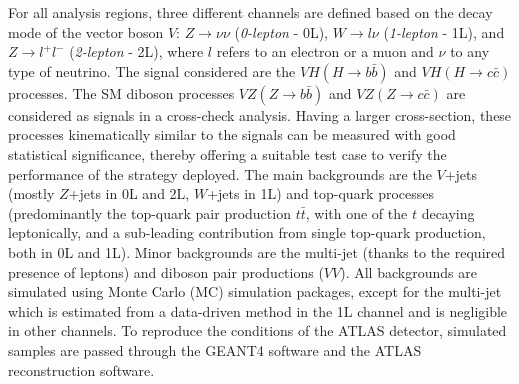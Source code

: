 For all analysis regions, three different channels are defined based on the decay mode of the vector boson $V$: $Z \rightarrow \nu \nu$ (\textit{0-lepton} - 0L), $W \rightarrow l \nu $ (\textit{1-lepton} - 1L), and $Z \rightarrow l^+ l^-$ (\textit{2-lepton} - 2L), where $l$ refers to an electron or a muon and $\nu$ to any type of neutrino. The signal considered are the  $VH (H\rightarrow b\bar{b})$ and $VH (H\rightarrow c\bar{c})$ processes. The SM diboson processes $VZ (Z\rightarrow b\bar{b})$ and $VZ (Z\rightarrow c\bar{c})$ are considered as signals in a cross-check analysis. Having a larger cross-section, these processes kinematically similar to the signals can be measured with good statistical significance, thereby offering a suitable test case to verify the performance of the strategy deployed. The main backgrounds are the $V$+jets (mostly $Z$+jets in 0L and 2L, $W$+jets in 1L) and top-quark processes (predominantly the top-quark pair production $t\bar{t}$, with one of the $t$ decaying leptonically, and a sub-leading contribution from single top-quark production, both in 0L and 1L). Minor backgrounds are the multi-jet (thanks to the required presence of leptons) and diboson pair productions ($VV$). All backgrounds are simulated using Monte Carlo (MC) simulation packages, except for the multi-jet which is estimated from a data-driven method in the 1L channel and is negligible in other channels. To reproduce the conditions of the ATLAS detector, simulated samples are passed through the GEANT4 software \cite{Agostinelli:602040} and the ATLAS reconstruction software.

